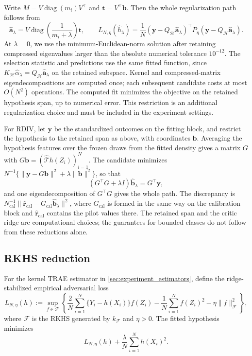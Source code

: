 Write $M=V\operatorname{diag}(m_i)V^\top$ and $\boldsymbol t=V^\top\boldsymbol b$. Then the whole regularization path follows from
\begin{equation}\label{eq:rkhs_path}
\widehat{\boldsymbol a}_\lambda
=V\operatorname{diag}\!\left(\frac{1}{m_i+\lambda}\right)\boldsymbol t,
\qquad
L_{N,\eta}(\widehat h_\lambda)
=\frac1N(\boldsymbol y-Q_{\mathcal H}\widehat{\boldsymbol a}_\lambda)^\top
P_\eta(\boldsymbol y-Q_{\mathcal H}\widehat{\boldsymbol a}_\lambda).
\end{equation}
At $\lambda=0$, we use the minimum-Euclidean-norm solution after retaining compressed eigenvalues larger than the absolute numerical tolerance $10^{-12}$. The selection statistic and predictions use the same fitted function, since $K_{\mathcal H}\widehat\alpha_\lambda=Q_{\mathcal H}\widehat{\boldsymbol a}_\lambda$ on the retained subspace. Kernel and compressed-matrix eigendecompositions are computed once; each subsequent candidate costs at most $O(N^2)$ operations. The computed fit minimizes the objective on the retained hypothesis span, up to numerical error. This restriction is an additional regularization choice and must be included in the experiment settings.

For RDIV, let $\boldsymbol y$ be the standardized outcomes on the fitting block, and restrict the hypothesis to the retained span as above, with coordinates $\boldsymbol b$. Averaging the hypothesis features over the frozen draws from the fitted density gives a matrix $G$ with $G\boldsymbol b=(\hat{\mathcal T}h(Z_i))_{i=1}^N$. The candidate minimizes $N^{-1}\{\|\boldsymbol y-G\boldsymbol b\|^2+\lambda\|\boldsymbol b\|^2\}$, so that
\[
(G^\top G+\lambda I)\widehat{\boldsymbol b}_\lambda=G^\top\boldsymbol y,
\]
and one eigendecomposition of $G^\top G$ gives the whole path. The discrepancy is $N_{\mathrm{cal}}^{-1}\|\hat{\boldsymbol r}_{\mathrm{cal}}-G_{\mathrm{cal}}\widehat{\boldsymbol b}_\lambda\|^2$, where $G_{\mathrm{cal}}$ is formed in the same way on the calibration block and $\hat{\boldsymbol r}_{\mathrm{cal}}$ contains the pilot values there. The retained span and the critic ridge are computational choices; the guarantees for bounded classes do not follow from these reductions alone.


\subsection{RKHS reduction}

For the kernel TRAE estimator in \cref{sec:experiment_estimators}, define the ridge-stabilized empirical adversarial loss
\begin{equation}
\label{eq:rkhs_adversarial_loss}
L_{N,\eta}(h)
:=\sup_{f\in\mathcal F}
\left\{
\frac{2}{N}\sum_{i=1}^N\{Y_i-h(X_i)\}f(Z_i)
-\frac{1}{N}\sum_{i=1}^N f(Z_i)^2
-\eta\|f\|_{\mathcal F}^2
\right\},
\end{equation}
where $\mathcal F$ is the RKHS generated by $k_{\mathcal F}$ and $\eta>0$. The fitted hypothesis minimizes
\[
L_{N,\eta}(h)+\frac{\lambda}{N}\sum_{i=1}^N h(X_i)^2.
\]

